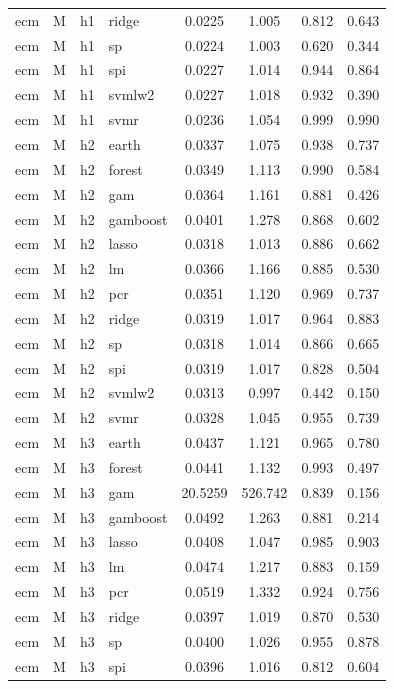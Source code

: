 \begin{ThreePartTable}
\begin{longtable}[t]{llclcccc}
ecm & M & h1 & ridge & 0.0225 & 1.005 & 0.812 & 0.643\\
ecm & M & h1 & sp & 0.0224 & 1.003 & 0.620 & 0.344\\
ecm & M & h1 & spi & 0.0227 & 1.014 & 0.944 & 0.864\\
ecm & M & h1 & svmlw2 & 0.0227 & 1.018 & 0.932 & 0.390\\
ecm & M & h1 & svmr & 0.0236 & 1.054 & 0.999 & 0.990\\
\addlinespace
ecm & M & h2 & earth & 0.0337 & 1.075 & 0.938 & 0.737\\
ecm & M & h2 & forest & 0.0349 & 1.113 & 0.990 & 0.584\\
ecm & M & h2 & gam & 0.0364 & 1.161 & 0.881 & 0.426\\
ecm & M & h2 & gamboost & 0.0401 & 1.278 & 0.868 & 0.602\\
ecm & M & h2 & lasso & 0.0318 & 1.013 & 0.886 & 0.662\\
ecm & M & h2 & lm & 0.0366 & 1.166 & 0.885 & 0.530\\
ecm & M & h2 & pcr & 0.0351 & 1.120 & 0.969 & 0.737\\
ecm & M & h2 & ridge & 0.0319 & 1.017 & 0.964 & 0.883\\
ecm & M & h2 & sp & 0.0318 & 1.014 & 0.866 & 0.665\\
ecm & M & h2 & spi & 0.0319 & 1.017 & 0.828 & 0.504\\
ecm & M & h2 & svmlw2 & 0.0313 & 0.997 & 0.442 & 0.150\\
ecm & M & h2 & svmr & 0.0328 & 1.045 & 0.955 & 0.739\\
\addlinespace
ecm & M & h3 & earth & 0.0437 & 1.121 & 0.965 & 0.780\\
ecm & M & h3 & forest & 0.0441 & 1.132 & 0.993 & 0.497\\
ecm & M & h3 & gam & 20.5259 & 526.742 & 0.839 & 0.156\\
ecm & M & h3 & gamboost & 0.0492 & 1.263 & 0.881 & 0.214\\
ecm & M & h3 & lasso & 0.0408 & 1.047 & 0.985 & 0.903\\
ecm & M & h3 & lm & 0.0474 & 1.217 & 0.883 & 0.159\\
ecm & M & h3 & pcr & 0.0519 & 1.332 & 0.924 & 0.756\\
ecm & M & h3 & ridge & 0.0397 & 1.019 & 0.870 & 0.530\\
ecm & M & h3 & sp & 0.0400 & 1.026 & 0.955 & 0.878\\
ecm & M & h3 & spi & 0.0396 & 1.016 & 0.812 & 0.604\\

\end{longtable}
\end{ThreePartTable}
